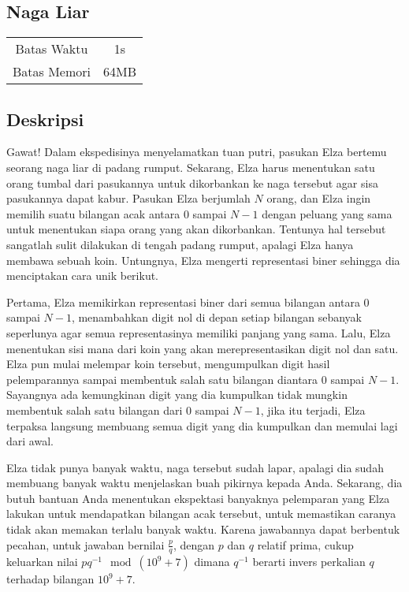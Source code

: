 \documentclass{article}
\begin{document}
\begin{center}
    \section*{Naga Liar} %

    \begin{tabular}{ | c c | }
        \hline
        Batas Waktu  & 1s \\    %
        Batas Memori & 64MB \\  %
        \hline
    \end{tabular}
\end{center}

\subsection*{Deskripsi}
Gawat! Dalam ekspedisinya menyelamatkan tuan putri, pasukan Elza bertemu seorang naga liar di padang rumput. Sekarang, Elza harus menentukan satu orang tumbal dari pasukannya untuk dikorbankan ke naga tersebut agar sisa pasukannya dapat kabur. Pasukan Elza berjumlah $N$ orang, dan Elza ingin memilih suatu bilangan acak antara $0$ sampai $N-1$ dengan peluang yang sama untuk menentukan siapa orang yang akan dikorbankan. Tentunya hal tersebut sangatlah sulit dilakukan di tengah padang rumput, apalagi Elza hanya membawa sebuah koin. Untungnya, Elza mengerti representasi biner sehingga dia menciptakan cara unik berikut.

Pertama, Elza memikirkan representasi biner dari semua bilangan antara $0$ sampai $N-1$, menambahkan digit nol di depan setiap bilangan sebanyak seperlunya agar semua representasinya memiliki panjang yang sama. Lalu, Elza menentukan sisi mana dari koin yang akan merepresentasikan digit nol dan satu. Elza pun mulai melempar koin tersebut, mengumpulkan digit hasil pelemparannya sampai membentuk salah satu bilangan diantara $0$ sampai $N-1$. Sayangnya ada kemungkinan digit yang dia kumpulkan tidak mungkin membentuk salah satu bilangan dari $0$ sampai $N-1$, jika itu terjadi, Elza terpaksa langsung membuang semua digit yang dia kumpulkan dan memulai lagi dari awal.

Elza tidak punya banyak waktu, naga tersebut sudah lapar, apalagi dia sudah membuang banyak waktu menjelaskan buah pikirnya kepada Anda. Sekarang, dia butuh bantuan Anda menentukan ekspektasi banyaknya pelemparan yang Elza lakukan untuk mendapatkan bilangan acak tersebut, untuk memastikan caranya tidak akan memakan terlalu banyak waktu. Karena jawabannya dapat berbentuk pecahan, untuk jawaban bernilai $\frac{p}{q}$, dengan $p$ dan $q$ relatif prima, cukup keluarkan nilai $pq^{-1} \mod (10^9+7)$ dimana $q^{-1}$ berarti invers perkalian $q$ terhadap bilangan $10^9+7$.
\end{document}
